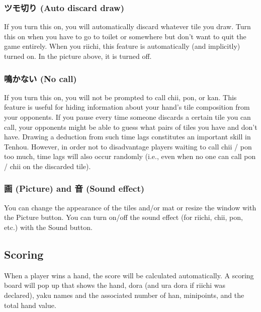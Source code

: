 \subsubsection{ツモ切り (Auto discard draw)} 
If you turn this on, you will automatically discard whatever tile you draw. Turn this on when you have to go to toilet or somewhere but don't want to quit the game entirely. When you riichi, this feature is automatically (and implicitly) turned on. In the picture above, it is turned off. 

\subsubsection{鳴かない (No call)}
If you turn this on, you will not be prompted to call {\jap chii}, {\jap pon}, or {\jap kan}. This feature is useful for hiding information about your hand's tile composition from your opponents. If you pause every time someone discards a certain tile you can call, your opponents might be able to guess what pairs of tiles you have and don't have. Drawing a deduction from such time lags constitutes an important skill in {\jap Tenhou}. However, in order not to disadvantage players waiting to call {\jap chii} / {\jap pon} too much, time lags will also occur randomly (i.e., even when no one can call {\jap pon} / {\jap chii} on the discarded tile). 

\subsubsection{画 (Picture) and 音 (Sound effect)}
You can change the appearance of the tiles and/or mat or resize the window with the Picture button. You can turn on/off the sound effect (for riichi, {\jap chii}, {\jap pon}, etc.) with the Sound button.

\vfill

\subsection{Scoring}
When a player wins a hand, the score will be calculated automatically. A scoring board will pop up that shows the hand, {\jap dora} (and {\jap ura dora} if riichi was declared), {\jap yaku} names and the associated number of {\jap han}, minipoints, and the total hand value. 

